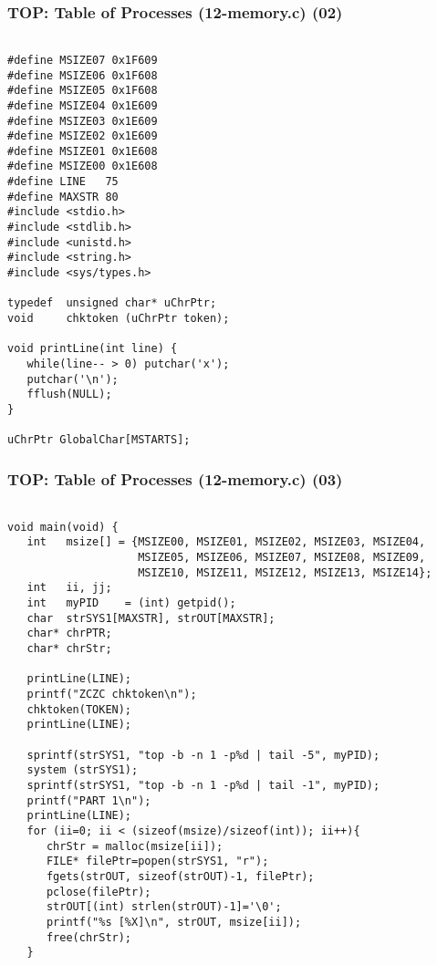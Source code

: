 \documentclass[xcolor=table, notheorems, hyperref={pdfpagelabels=false}]{beamer}
\begin{document}
\begin{frame}[fragile]
\frametitle{TOP: Table of Processes (12-memory.c) (02)}
\begin{lstlisting}[basicstyle=\ttfamily\tiny]

#define MSIZE07 0x1F609
#define MSIZE06 0x1F608
#define MSIZE05 0x1F608
#define MSIZE04 0x1E609
#define MSIZE03 0x1E609
#define MSIZE02 0x1E609
#define MSIZE01 0x1E608
#define MSIZE00 0x1E608
#define LINE   75
#define MAXSTR 80
#include <stdio.h>
#include <stdlib.h>
#include <unistd.h>
#include <string.h>
#include <sys/types.h>

typedef  unsigned char* uChrPtr;
void     chktoken (uChrPtr token);

void printLine(int line) {
   while(line-- > 0) putchar('x');
   putchar('\n');
   fflush(NULL);
}

uChrPtr GlobalChar[MSTARTS];

\end{lstlisting}
\end{frame}

\begin{frame}[fragile]
\frametitle{TOP: Table of Processes (12-memory.c) (03)}
\begin{lstlisting}[basicstyle=\ttfamily\tiny]

void main(void) {
   int   msize[] = {MSIZE00, MSIZE01, MSIZE02, MSIZE03, MSIZE04, 
                    MSIZE05, MSIZE06, MSIZE07, MSIZE08, MSIZE09,
                    MSIZE10, MSIZE11, MSIZE12, MSIZE13, MSIZE14};
   int   ii, jj;
   int   myPID    = (int) getpid();
   char  strSYS1[MAXSTR], strOUT[MAXSTR];
   char* chrPTR; 
   char* chrStr;

   printLine(LINE);
   printf("ZCZC chktoken\n");
   chktoken(TOKEN);
   printLine(LINE);

   sprintf(strSYS1, "top -b -n 1 -p%d | tail -5", myPID);
   system (strSYS1);
   sprintf(strSYS1, "top -b -n 1 -p%d | tail -1", myPID);
   printf("PART 1\n");
   printLine(LINE);
   for (ii=0; ii < (sizeof(msize)/sizeof(int)); ii++){
      chrStr = malloc(msize[ii]);
      FILE* filePtr=popen(strSYS1, "r");
      fgets(strOUT, sizeof(strOUT)-1, filePtr);
      pclose(filePtr);
      strOUT[(int) strlen(strOUT)-1]='\0';
      printf("%s [%X]\n", strOUT, msize[ii]);
      free(chrStr);
   }

\end{lstlisting}
\end{frame}
\end{document}
